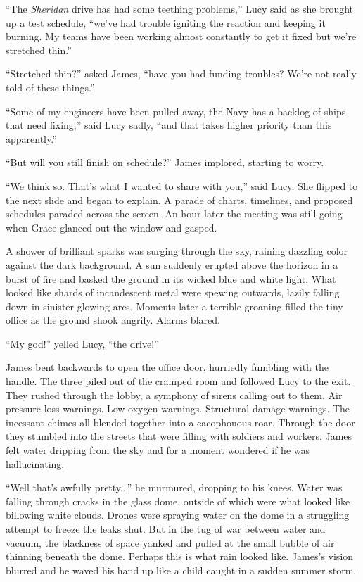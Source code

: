 \documentclass[openany, 12pt]{book} %
\begin{document}
``The \textit{Sheridan} drive has had some teething problems,'' Lucy said as she brought up a test schedule, ``we've had trouble igniting the reaction and keeping it burning. My teams have been working almost constantly to get it fixed but we're stretched thin.''

``Stretched thin?'' asked James, ``have you had funding troubles? We're not really told of these things.''

``Some of my engineers have been pulled away, the Navy has a backlog of ships that need fixing,'' said Lucy sadly, ``and that takes higher priority than this apparently.''

``But will you still finish on schedule?'' James implored, starting to worry. 

``We think so. That's what I wanted to share with you,'' said Lucy. She flipped to the next slide and began to explain. A parade of charts, timelines, and proposed schedules paraded across the screen. An hour later the meeting was still going when Grace glanced out the window and gasped.

A shower of brilliant sparks was surging through the sky, raining dazzling color against the dark background. A sun suddenly erupted above the horizon in a burst of fire and basked the ground in its wicked blue and white light. What looked like shards of incandescent metal were spewing outwards, lazily falling down in sinister glowing arcs. Moments later a terrible groaning filled the tiny office as the ground shook angrily. Alarms blared.

``My god!'' yelled Lucy, ``the drive!''

James bent backwards to open the office door, hurriedly fumbling with the handle. The three piled out of the cramped room and followed Lucy to the exit. They rushed through the lobby, a symphony of sirens calling out to them. Air pressure loss warnings. Low oxygen warnings. Structural damage warnings. The incessant chimes all blended together into a cacophonous roar. Through the door they stumbled into the streets that were filling with soldiers and workers. James felt water dripping from the sky and for a moment wondered if he was hallucinating.

``Well that's awfully pretty...'' he murmured, dropping to his knees. Water was falling through cracks in the glass dome, outside of which were what looked like billowing white clouds. Drones were spraying water on the dome in a struggling attempt to freeze the leaks shut. But in the tug of war between water and vacuum, the blackness of space yanked and pulled at the small bubble of air thinning beneath the dome. Perhaps this is what rain looked like. James's vision blurred and he waved his hand up like a child caught in a sudden summer storm.
\end{document}
